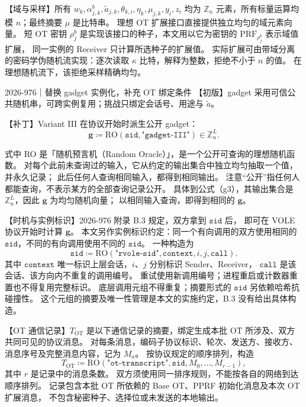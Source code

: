 【域与采样】所有 $w_k,\alpha^b_{j,k},\tilde a_{j,k},\theta_{k,i},\eta_k,\mu_{j,k},y_i,z_i$
均为 $\mathbb Z_n$ 元素，所有标量运算均模 $n$；最终摘要 $\mu$ 是比特串。
理想 OT 扩展接口直接提供独立均匀的域元素向量。
短 OT 密钥 $\rho_j^b$ 是实现该接口的种子，本文用以它为密钥的 $\mathrm{PRF}_{\rho_j^b}$ 表示域值扩展，
同一实例的 Receiver 只计算所选种子的扩展值。
实际扩展可由带域分离的密码学伪随机流实现：逐次读取 $\kappa$ 比特，解释为整数，拒绝不小于 $n$ 的值。
在理想随机流下，该拒绝采样精确均匀。

\begin{patchnote}{2026-976｜替换 gadget 实例化，补充 OT 绑定条件}
  【初版】gadget 采用可信公共随机串，可跨实例复用；挑战只绑定会话号、用途与 $\tilde a$。

  【补丁】Variant III 在协议开始时派生公开 gadget：
  \begin{equation}
    \label{eq:rvole:g3}\tag{g3}
    \boldsymbol g\coloneq \mathrm{RO}(\mathtt{sid},\texttt{"gadget-III"})
    \in \mathbb Z_n^L.
  \end{equation}

  式中 RO 是「随机预言机（Random Oracle）」，是一个公开可查询的理想随机函数。
  对每个此前未查询过的输入，它从约定的输出集合中独立均匀抽取一个值，并永久记录；
  此后任何人查询相同输入，都得到相同输出。
  注意“公开”指任何人都能查询，不表示某方的全部查询记录公开。
  具体到公式（g3），其输出集合是 $\mathbb Z_n^L$，因此 $\boldsymbol g$ 为均匀随机向量；
  以相同输入查询，即得到相同的 $\boldsymbol g$。


  【时机与实例标识】2026-976 附录 B.3 规定，双方拿到 $\mathtt{sid}$ 后，
  即可在 VOLE 协议开始时计算 $\boldsymbol g$。
  本文另作实例标识约定：同一个有向调用的双方使用相同的 $\mathtt{sid}$，不同的有向调用使用不同的 $\mathtt{sid}$。
  一种构造为
  \begin{equation*}
    \mathtt{sid}\coloneq \mathrm{RO}(\texttt{"rvole-sid"},\mathtt{context},i,j,\mathtt{call}).
  \end{equation*}
  其中 $\mathtt{context}$ 唯一标识上层会话，$i$、$j$ 分别标识 Sender、Receiver，
  $\mathtt{call}$ 是该会话、该方向内不重复的调用编号。
  重试使用新调用编号；进程重启或计数器重置也不得复用完整标识。
  底层调用元组不得重复；摘要形式的 $\mathtt{sid}$ 另依赖哈希抗碰撞性。
  这个元组的摘要及唯一性管理是本文的实施约定，B.3 没有给出具体构造。

  【OT 通信记录】$T_{\mathrm{OT}}$ 是以下通信记录的摘要，绑定生成本批 OT 所涉及、双方共同可见的协议消息。
  对每条消息，编码子协议标识、轮次、发送方、接收方、消息序号及完整消息内容，记为 $M_a$。
  按协议规定的顺序排列，构造
  \begin{equation*}
    T_{\mathrm{OT}}\coloneq \mathrm{RO}(\texttt{"ot-transcript"},\mathtt{sid},M_0,\ldots,M_{r-1}),
  \end{equation*}
  其中 $r$ 是记录中的消息条数。
  双方须使用同一排序规则，不能按各自的网络到达顺序排列。
  记录包含本批 OT 所依赖的 Base OT、PPRF 初始化消息及本次 OT 扩展消息，
  不包含秘密种子、选择位或未发送的本地输出。
\end{patchnote}

